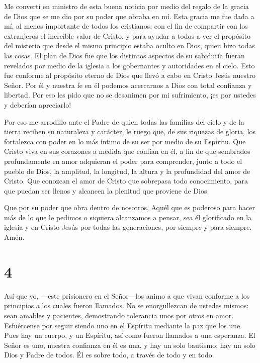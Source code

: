  Me convertí en ministro de esta buena noticia por medio del
regalo de la gracia de Dios que se me dio por su poder que obraba en mí.
 Esta gracia me fue dada a mí, al menos importante de todos
los cristianos, con el fin de compartir con los extranjeros el increíble
valor de Cristo,  y para ayudar a todos a ver el propósito
del misterio que desde el mismo principio estaba oculto en Dios, quien
hizo todas las cosas.  El plan de Dios fue que los
distintos aspectos de su sabiduría fueran revelados por medio de la
iglesia a los gobernantes y autoridades en el cielo.  Esto
fue conforme al propósito eterno de Dios que llevó a cabo en Cristo
Jesús nuestro Señor.  Por él y nuestra fe en él podemos
acercarnos a Dios con total confianza y libertad.  Por eso
les pido que no se desanimen por mi sufrimiento, ¡es por ustedes y
deberían apreciarlo!

 Por eso me arrodillo ante el Padre  de quien
todas las familias del cielo y de la tierra reciben su naturaleza y
carácter,  le ruego que, de sus riquezas de gloria, los
fortalezca con poder en lo más íntimo de su ser por medio de su
Espíritu.  Que Cristo viva en sus corazones a medida que
confían en él, a fin de que sembrados profundamente en amor
 adquieran el poder para comprender, junto a todo el pueblo
de Dios, la amplitud, la longitud, la altura y la profundidad del amor
de Cristo.  Que conozcan el amor de Cristo que sobrepasa
todo conocimiento, para que puedan ser llenos y alcancen la plenitud que
proviene de Dios.

 Que por su poder que obra dentro de nosotros, Aquél que es
poderoso para hacer más de lo que le pedimos o siquiera alcanzamos a
pensar,  sea él glorificado en la iglesia y en Cristo Jesús
por todas las generaciones, por siempre y para siempre. Amén.

\hypertarget{section-3}{%
\section{4}\label{section-3}}

 Así que yo, ---este prisionero en el Señor---los animo a
que vivan conforme a los principios a los cuales fueron llamados.
 No se enorgullezcan de ustedes mismos; sean amables y
pacientes, demostrando tolerancia unos por otros en amor. 
Esfuércense por seguir siendo uno en el Espíritu mediante la paz que los
une.  Pues hay un cuerpo, y un Espíritu, así como fueron
llamados a una esperanza.  El Señor es uno, nuestra
confianza en él es una, y hay un solo bautismo;  hay un solo
Dios y Padre de todos. Él es sobre todo, a través de todo y en todo.

